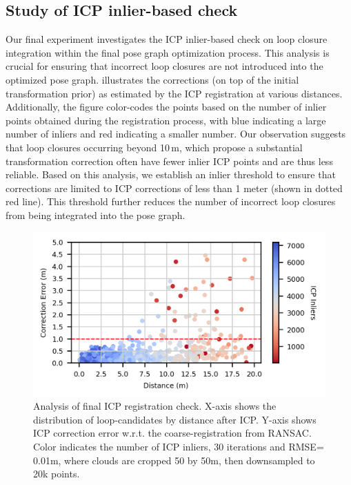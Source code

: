 \subsection*{Study of ICP inlier-based check}
\label{sec:exp_icp_ablation}
Our final experiment investigates the ICP inlier-based check on loop closure integration within the final pose graph optimization process. This analysis is crucial for ensuring that incorrect loop closures are not introduced into the optimized pose graph.
 illustrates the corrections (on top of the initial transformation prior) as estimated by the ICP registration at various distances. Additionally, the figure color-codes the points based on the number of inlier points obtained during the registration process, with blue indicating a large number of inliers and red indicating a smaller number.
Our observation suggests that loop closures occurring beyond 10\,m, which propose a substantial transformation correction often have fewer inlier ICP points and are thus less reliable.
Based on this analysis, we establish an inlier threshold to ensure that corrections are limited to ICP corrections of less than 1 meter (shown in dotted red line). This threshold further reduces the number of incorrect loop closures from being integrated into the pose graph.
\begin{figure}[t]
  \centering
  \includegraphics[width=0.99\linewidth]{pics/exp_4_ablation_icp_inliers_4cm}
  \caption{Analysis of final ICP registration check. X-axis shows the distribution of loop-candidates by distance after ICP.
  Y-axis shows ICP correction error w.r.t. the coarse-registration from RANSAC. Color indicates the number of ICP inliers,  30 iterations and RMSE= 0.01m, where clouds are cropped 50 by 50m, then downsampled to 20k points.}
  \label{fig:icp_inliers}
\end{figure}

